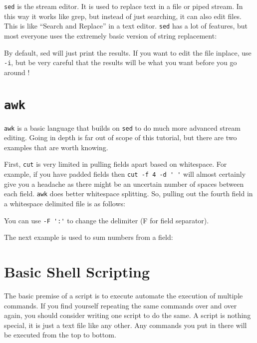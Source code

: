 \verb|sed| is the stream editor. It is used to replace text in a
file or piped stream. In this way it works like grep, but instead of just
searching, it can also edit files. This is like ``Search and Replace'' in a text
editor. \verb|sed| has a lot of features, but most everyone uses the extremely
basic version of string replacement:

\begin{prompt}
\end{prompt}

By default, sed will just print the results. If you want to edit the file inplace, use
\verb|-i|, but be very careful that the results will be what you want before you go
around !

\section{\texttt{awk}}
\verb|awk| is a basic language that builds on \verb|sed| to do much more advanced
stream editing. Going in depth is far out of scope of this tutorial, but there
are two examples that are worth knowing.

First, \verb|cut| is very limited in pulling fields apart based on whitespace. For
example, if you have padded fields then \verb|cut -f 4 -d ' '| will almost
certainly give you a headache as there might be an uncertain number of spaces
between each field. \verb|awk| does better whitespace splitting. So, pulling out
the fourth field in a whitespace delimited file is as follows:

\begin{prompt}
\end{prompt}

You can use \verb|-F ':'| to change the delimiter (F for field separator).

The next example is used to sum numbers from a field:

\begin{prompt}
\end{prompt}

\section{Basic Shell Scripting}

The basic premise of a script is to execute automate the execution of multiple
commands. If you find yourself repeating the same commands over and over again,
you should consider writing one script to do the same.  A script is nothing
special, it is just a text file like any other. Any commands you put in there
will be executed from the top to bottom.

